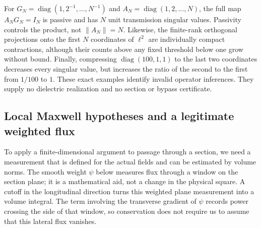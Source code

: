 \begin{remark}
\label{ch:algebraaudit}
For $G_N=\operatorname{diag}(1,2^{-1},\ldots,N^{-1})$ and
$A_N=\operatorname{diag}(1,2,\ldots,N)$, the full map $A_NG_N=I_N$
is passive and has $N$ unit transmission singular values.  Passivity controls
the product, not $\|A_N\|=N$.  Likewise, the finite-rank orthogonal projections
onto the first $N$ coordinates of $\ell^2$ are individually compact
contractions, although their counts above any fixed threshold below one grow
without bound.  Finally, compressing $\operatorname{diag}(100,1,1)$ to the
last two coordinates decreases every singular value, but increases the ratio
of the second to the first from $1/100$ to $1$.  These exact examples identify
invalid operator inferences.  They supply no dielectric realization and no
section or bypass certificate.
\end{remark}

\subsection{Local Maxwell hypotheses and a legitimate weighted flux}
\label{ch:local}

To apply a finite-dimensional argument to passage through a section, we need
a measurement that is defined for the actual fields and can be estimated by
volume norms.  The smooth weight $\psi$ below measures flux through a window
on the section plane; it is a mathematical aid, not a change in the physical
square.  A cutoff in the longitudinal direction turns this weighted plane
measurement into a volume integral.  The term involving the transverse gradient
of $\psi$ records power crossing the side of that window, so conservation
does not require us to assume that this lateral flux vanishes.

